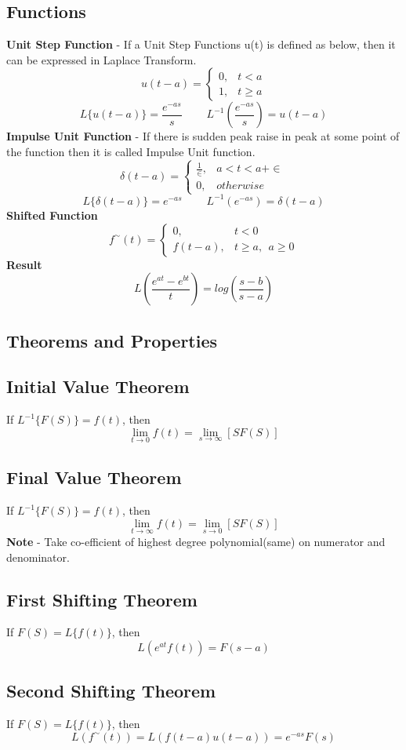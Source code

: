 \subsection*{Functions}
\textbf{Unit Step Function} - If a Unit Step Functions u(t) is defined as below, then it can be expressed in Laplace Transform.
\[u(t-a)=
\begin{cases}
    0, &t<a \\
    1, &t\geq a
\end{cases}
\]
\[L\{u(t-a)\}=\frac{e^{-as}}{s}\ \ \ \ \ \ \ \ \ \ L^{-1} \left( \frac{e^{-as}}{s}\right)=u(t-a)\]
\textbf{Impulse Unit Function} -  If there is sudden peak raise in peak at some point of the function then it is called Impulse Unit function.
\[\delta(t-a)=
\begin{cases}
    \frac{1}{\in}, &a<t<a+\in \\
    0, &otherwise
\end{cases}
\]
\[L\{\delta(t-a)\}=e^{-as}\ \ \ \ \ \ \ \ \ \ L^{-1} \left( e^{-as} \right) =\delta(t-a)\]
\textbf{Shifted Function}
\[f^{\sim}(t)=
\begin{cases}
    0, &t<0 \\
    f(t-a), &t\geq a,\ \ a\geq0 
\end{cases}
\]
\textbf{Result}
\[L \left( \frac{e^{at}-e^{bt}}{t} \right)=log\left(\frac{s-b}{s-a}\right) \]
\subsection*{Theorems and Properties}
\subsection*{Initial Value Theorem}
If \(L^{-1}\{F(S)\}=f(t)\), then \[\lim_{t \to 0}f(t)=\lim_{s\to \infty}[SF(S)]\]
\subsection*{Final Value Theorem}
If \(L^{-1}\{F(S)\}=f(t)\), then \[\lim_{t \to \infty}f(t)=\lim_{s\to 0}[SF(S)]\]
\textbf{Note} - Take co-efficient of highest degree polynomial(same) on numerator and denominator.

\subsection*{First Shifting Theorem}
If \(F(S)=L\{f(t)\}\), then
\[L\left(e^{at}f(t)\right)=F(s-a)\]

\subsection*{Second Shifting Theorem}
If \(F(S)=L\{f(t)\}\), then
\[L\left(f^{\sim}(t)\right)=L\left(f(t-a)u(t-a)\right)=e^{-as}F(s)\]


